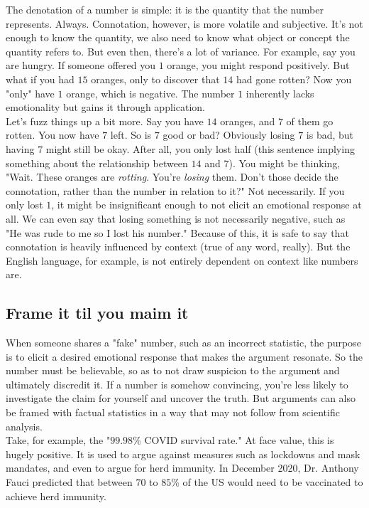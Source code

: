 \documentclass{article}
\begin{document}
The denotation of a number is simple: it is the quantity that the number represents. Always. Connotation, however, is more volatile and subjective. It's not enough to know the quantity, we also need to know what object or concept the quantity refers to. But even then, there's a lot of variance. For example, say you are hungry. If someone offered you $1$ orange, you might respond positively. But what if you had $15$ oranges, only to discover that $14$ had gone rotten? Now you "only" have $1$ orange, which is negative. The number $1$ inherently lacks emotionality but gains it through application.\\

Let's fuzz things up a bit more. Say you have $14$ oranges, and $7$ of them go rotten. You now have $7$ left. So is $7$ good or bad? Obviously losing $7$ is bad, but having $7$ might still be okay. After all, you only lost half (this sentence implying something about the relationship between $14$ and $7$). You might be thinking, "Wait. These oranges are \textit{rotting}. You're \textit{losing} them. Don't those decide the connotation, rather than the number in relation to it?" Not necessarily. If you only lost $1$, it might be insignificant enough to not elicit an emotional response at all. We can even say that losing something is not necessarily negative, such as "He was rude to me so I lost his number." Because of this, it is safe to say that connotation is heavily influenced by context (true of any word, really). But the English language, for example, is not entirely dependent on context like numbers are.

\subsection*{Frame it til you maim it}

\hspace{\parindent}When someone shares a "fake" number, such as an incorrect statistic, the purpose is to elicit a desired emotional response that makes the argument resonate. So the number must be believable, so as to not draw suspicion to the argument and ultimately discredit it. If a number is somehow convincing, you're less likely to investigate the claim for yourself and uncover the truth. But arguments can also be framed with factual statistics in a way that may not follow from scientific analysis.\\

Take, for example, the "$99.98\%$ COVID survival rate." At face value, this is hugely positive. It is used to argue against measures such as lockdowns and mask mandates, and even to argue for herd immunity. In December 2020, Dr. Anthony Fauci predicted that between $70$ to $85\%$ of the US would need to be vaccinated to achieve herd immunity.\\
\end{document}
